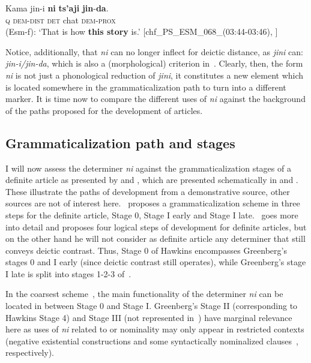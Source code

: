 \documentclass[output=paper
,modfonts
,nonflat]{langsci/langscibook}
\begin{document}
\gll Kama jin-i \textbf{ni} \textbf{ts'aji} \textbf{jin}-\textbf{da}.\\
\textsc{q} \textsc{dem}-\textsc{dist} \textsc{det} {chat} \textsc{dem}-\textsc{prox} \\
\glt (Esm-f): `That is how \textbf{this story} is.' [chf\_PS\_ESM\_068\_(03:44-03:46), \citealt{Delgado-Galvan2018archive}]
\z

Notice, additionally, that \textit{ni} can no longer inflect for deictic distance, as \textit{jini} can: \textit{jin-i/jin-da}, which is also a (morphological) criterion in~\citet[][118]{Diessel1999}. Clearly, then, the form \textit{ni} is not just a phonological reduction of \textit{jini}, it constitutes a new element which is located somewhere in the grammaticalization path to turn into a different marker. It is time now to compare the different uses of \textit{ni} against the background of the paths proposed for the development of articles.

\subsection{Grammaticalization path and stages}\label{sec:pico:4.2}

I will now assess the determiner \textit{ni} against the grammaticalization stages of a definite article as presented by \citet[61--74]{Greenberg1978howgender} and \citet[84--86]{Hawkins2004}, which are presented schematically in  and . These illustrate the paths of development from a demonstrative source, other sources are not of interest here.~\cite{Greenberg1978howgender} proposes a grammaticalization scheme in three steps for the definite article, Stage 0, Stage I early and Stage I late.~\cite{Hawkins2004} goes more into detail and proposes four logical steps of development for definite articles, but on the other hand he will not consider as definite article any determiner that still conveys deictic contrast. Thus, Stage 0 of Hawkins encompasses Greenberg's stages 0 and I early (since deictic contrast still operates), while Greenberg's stage I late is split into stages 1-2-3 of~\cite{Hawkins2004}.

In the coarsest scheme~\citep{Greenberg1978howgender}, the main functionality of the determiner \textit{ni} can be located in between Stage 0 and Stage I. Greenberg's Stage II (corresponding to Hawkins Stage 4) and Stage III (not represented in~\citealt{Hawkins2004}) have marginal relevance here as uses of \textit{ni} related to  or nominality may only appear in restricted contexts (negative existential constructions and some syntactically nominalized clauses~\citep[][397, 408]{Becquey2014}, respectively).
\end{document}
